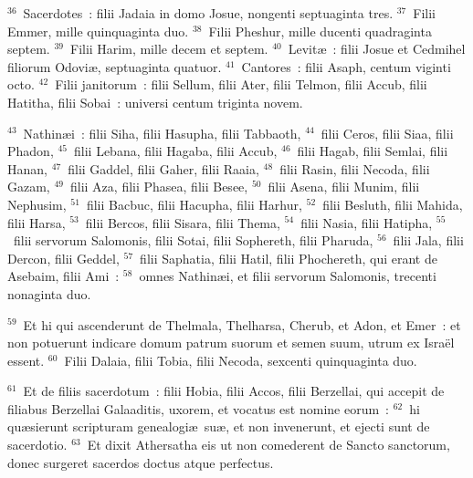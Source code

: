${}^{36}$~Sacerdotes~: filii Jadaia in domo Josue, nongenti septuaginta tres.
${}^{37}$~Filii Emmer, mille quinquaginta duo.
${}^{38}$~Filii Pheshur, mille ducenti quadraginta septem.
${}^{39}$~Filii Harim, mille decem et septem.
${}^{40}$~Levit\ae~: filii Josue et Cedmihel filiorum Odovi\ae , septuaginta quatuor.
${}^{41}$~Cantores~: filii Asaph, centum viginti octo.
${}^{42}$~Filii janitorum~: filii Sellum, filii Ater, filii Telmon, filii Accub, filii Hatitha, filii Sobai~: universi centum triginta novem.


${}^{43}$~Nathin\ae i~: filii Siha, filii Hasupha, filii Tabbaoth,
${}^{44}$~filii Ceros, filii Siaa, filii Phadon,
${}^{45}$~filii Lebana, filii Hagaba, filii Accub,
${}^{46}$~filii Hagab, filii Semlai, filii Hanan,
${}^{47}$~filii Gaddel, filii Gaher, filii Raaia,
${}^{48}$~filii Rasin, filii Necoda, filii Gazam,
${}^{49}$~filii Aza, filii Phasea, filii Besee,
${}^{50}$~filii Asena, filii Munim, filii Nephusim,
${}^{51}$~filii Bacbuc, filii Hacupha, filii Harhur,
${}^{52}$~filii Besluth, filii Mahida, filii Harsa,
${}^{53}$~filii Bercos, filii Sisara, filii Thema,
${}^{54}$~filii Nasia, filii Hatipha,
${}^{55}$~filii servorum Salomonis, filii Sotai, filii Sophereth, filii Pharuda,
${}^{56}$~filii Jala, filii Dercon, filii Geddel,
${}^{57}$~filii Saphatia, filii Hatil, filii Phochereth, qui erant de Asebaim, filii Ami~:
${}^{58}$~omnes Nathin\ae i, et filii servorum Salomonis, trecenti nonaginta duo.


${}^{59}$~Et hi qui ascenderunt de Thelmala, Thelharsa, Cherub, et Adon, et Emer~: et non potuerunt indicare domum patrum suorum et semen suum, utrum ex Isra\"el essent.
${}^{60}$~Filii Dalaia, filii Tobia, filii Necoda, sexcenti quinquaginta duo.


${}^{61}$~Et de filiis sacerdotum~: filii Hobia, filii Accos, filii Berzellai, qui accepit de filiabus Berzellai Galaaditis, uxorem, et vocatus est nomine eorum~:
${}^{62}$~hi qu\ae sierunt scripturam genealogi\ae\ su\ae , et non invenerunt, et ejecti sunt de sacerdotio.
${}^{63}$~Et dixit Athersatha eis ut non comederent de Sancto sanctorum, donec surgeret sacerdos doctus atque perfectus.


